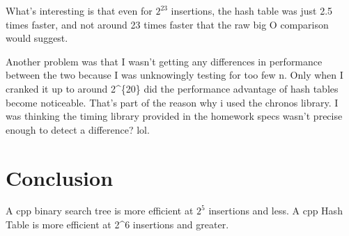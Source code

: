 \documentclass[11pt]{article}
\begin{document}
What's interesting is that even for \(2^{23}\) insertions, the hash
table was just 2.5 times faster, and not around 23 times faster that the
raw big O comparison would suggest.

Another problem was that I wasn't getting any differences in performance
between the two because I was unknowingly testing for too few n. Only
when I cranked it up to around 2\^{}\{20\} did the performance advantage
of hash tables become noticeable. That's part of the reason why i used
the chronos library. I was thinking the timing library provided in the
homework specs wasn't precise enough to detect a difference? lol.

    \section{Conclusion}\label{conclusion}

A cpp binary search tree is more efficient at \(2^5\) insertions and
less. A cpp Hash Table is more efficient at 2\^{}6 insertions and
greater.


    
    
    
    
\end{document}
